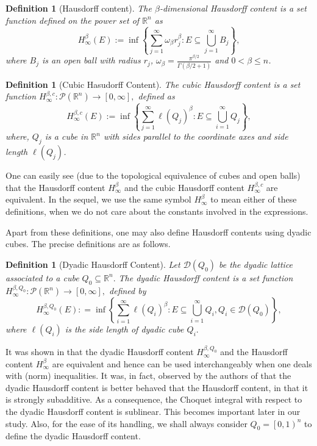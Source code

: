 \documentclass{amsart}
\newtheorem{definition}[theorem]{Definition}
\numberwithin{theorem}{section}
\numberwithin{equation}{section}
\begin{document}
		\begin{definition}[Hausdorff content]
			\label{HausdorffContent}
			The $\beta$-dimensional Hausdorff content is a set function defined on the power set of $\mathbb{R}^n$ as 
			\begin{equation}\label{Hausdorff}
				H_\infty^\beta(E) := \inf\left\{\sum_{j=1}^\infty \omega_\beta r_j^\beta : E \subseteq \bigcup_{j=1}^\infty B_j \right\},
			\end{equation}
			where $B_j$ is an open ball with radius $r_j$, $\omega_\beta = \frac{\pi^{\beta/2}}{\Gamma(\beta/2 +1)}$ and $0< \beta \leq n$.
		\end{definition}
		\begin{definition}[Cubic Hasudorff Content]
			\label{CubicHC}
			The cubic Hausdorff content is a set function $H_\infty^{\beta,c}: \mathcal{P}(\mathbb{R}^n) \rightarrow [0,\infty],$ defined as
			\begin{equation}
				H_\infty^{\beta,c} (E) := \inf\left \{\sum_{j=1}^{\infty}\ell (Q_j)^\beta : E \subseteq \bigcup_{i=1}^\infty Q_j \right\},
			\end{equation}
			where, $Q_j$ is a cube in $\mathbb{R}^n$ with sides parallel to the coordinate axes and side length $ \ell(Q_j)$. 
		\end{definition}
		One can easily see (due to the topological equivalence of cubes and open balls) that the Hausdorff content $H^{\beta}_{\infty}$ and the cubic Hausdorff content $H^{\beta, c}_{\infty}$ are equivalent. In the sequel, we use the same symbol $H^{\beta}_{\infty}$ to mean either of these definitions, when we do not care about the constants involved in the expressions.
		
		Apart from these definitions, one may also define Hausdorff contents using dyadic cubes. The precise definitions are as follows.
		\begin{definition}[Dyadic Hausdorff Content]
			Let $\mathcal{D}(Q_0)$ be the dyadic lattice associated to a cube $Q_0 \subseteq \mathbb{R}^n.$ The dyadic Hausdorff content is a set function $H_\infty ^{\beta,Q_0} : \mathcal{P}(\mathbb{R}^n) \rightarrow [0,\infty],$ defined by
			\begin{equation}\label{dyadic}
				H_\infty^{\beta,Q_0} (E) : = \inf\left\{\sum_{i=1}^{\infty}\ell(Q_i)^\beta : E \subseteq \bigcup_{i=1}^{\infty}Q_i, Q_i \in \mathcal{D}(Q_0)\right\},
			\end{equation}
			where $\ell(Q_i)$ is the side length of dyadic cube $Q_i.$
		\end{definition}
		It was shown in \cite{PonceSpector} that the dyadic Hausdorff content $H_{\infty}^{\beta, Q_0}$ and the Hausdorff content $H^{\beta}_{\infty}$ are equivalent and hence can be used interchangeably when one deals with (norm) inequalities. It was, in fact, observed by the authors of \cite{PonceSpector} that the dyadic Hausdorff content is better behaved that the Hausdorff content, in that it is strongly subadditive. As a consequence, the Choquet integral with respect to the dyadic Hausdorff content is sublinear. This becomes important later in our study. Also, for the ease of its handling, we shall always consider $Q_0 = \left[ 0, 1 \right)^n$ to define the dyadic Hausdorff content.
		
\end{document}
